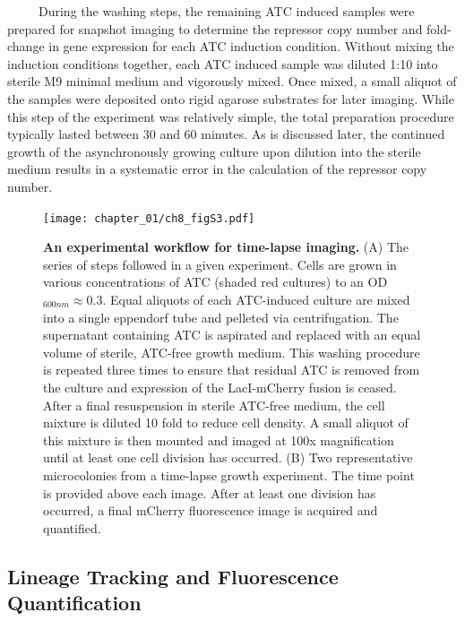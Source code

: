 \documentclass[12pt]{caltech_thesis}
\begin{document}
~~~~~During the washing steps, the remaining ATC induced samples were
prepared for snapshot imaging to determine the repressor copy number and
fold-change in gene expression for each ATC induction condition. Without
mixing the induction conditions together, each ATC induced sample was
diluted 1:10 into sterile M9 minimal medium and vigorously mixed. Once
mixed, a small aliquot of the samples were deposited onto rigid agarose
substrates for later imaging. While this step of the experiment was
relatively simple, the total preparation procedure typically lasted
between 30 and 60 minutes. As is discussed later, the continued growth
of the asynchronously growing culture upon dilution into the sterile
medium results in a systematic error in the calculation of the repressor
copy number.

\hypertarget{fig:growth_si_microscopy_workflow}{%
\begin{figure}
\centering
\texttt{[image: chapter\_01/ch8\_figS3.pdf]}
\caption[{An experimental workflow for determination of a fluorescence
calibration factor.}]{\textbf{An experimental workflow for time-lapse
imaging.} (A) The series of steps followed in a given experiment. Cells
are grown in various concentrations of ATC (shaded red cultures) to an
OD\(_{600nm} \approx 0.3\). Equal aliquots of each ATC-induced culture
are mixed into a single eppendorf tube and pelleted via centrifugation.
The supernatant containing ATC is aspirated and replaced with an equal
volume of sterile, ATC-free growth medium. This washing procedure is
repeated three times to ensure that residual ATC is removed from the
culture and expression of the LacI-mCherry fusion is ceased. After a
final resuspension in sterile ATC-free medium, the cell mixture is
diluted 10 fold to reduce cell density. A small aliquot of this mixture
is then mounted and imaged at 100x magnification until at least one cell
division has occurred. (B) Two representative microcolonies from a
time-lapse growth experiment. The time point is provided above each
image. After at least one division has occurred, a final mCherry
fluorescence image is acquired and quantified.}
\label{fig:growth_si_microscopy_workflow}
\end{figure}
}

\hypertarget{lineage-tracking-and-fluorescence-quantification}{%
\subsection{Lineage Tracking and Fluorescence
Quantification}\label{lineage-tracking-and-fluorescence-quantification}}
\end{document}
